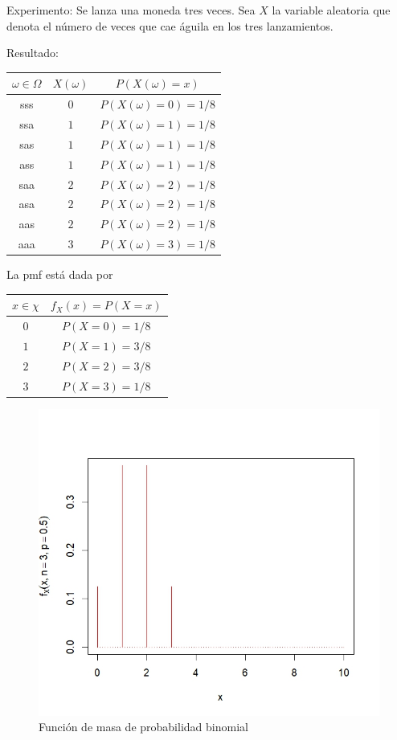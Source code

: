\begin{example}
Experimento: Se lanza una moneda tres veces. Sea $X$ la variable aleatoria que denota el número de veces que cae águila en los tres lanzamientos.

Resultado:
\begin{center}
\begin{tabular}{c|c|c}
\hline
$\omega \in \Omega $ & $X(\omega )$ & $P(X(\omega )=x)$ \\ \hline
sss & $0$ & $P(X(\omega )=0)=1/8$ \\ 
ssa & $1$ & $P(X(\omega )=1)=1/8$ \\ 
sas & $1$ & $P(X(\omega )=1)=1/8$ \\ 
ass & $1$ & $P(X(\omega )=1)=1/8$ \\ 
saa & $2$ & $P(X(\omega )=2)=1/8$ \\ 
asa & $2$ & $P(X(\omega )=2)=1/8$ \\ 
aas & $2$ & $P(X(\omega )=2)=1/8$ \\ 
aaa & $3$ & $P(X(\omega )=3)=1/8$ \\ \hline
\end{tabular}
\end{center}

La pmf está dada por

\begin{center}
\begin{tabular}{c|c}
\hline
$x\in \chi $ & $f_{X}(x)=P(X=x)$ \\ \hline
$0$ & $P(X=0)=1/8$ \\ 
$1$ & $P(X=1)=3/8$ \\ 
$2$ & $P(X=2)=3/8$ \\ 
$3$ & $P(X=3)=1/8$ \\ \hline
\end{tabular}
\end{center}
\end{example}

\begin{figure}[h!]
\centering
\includegraphics[scale=1]{Figuras/Binomial_n3.jpeg}
\caption{Función de masa de probabilidad binomial}
\end{figure}


